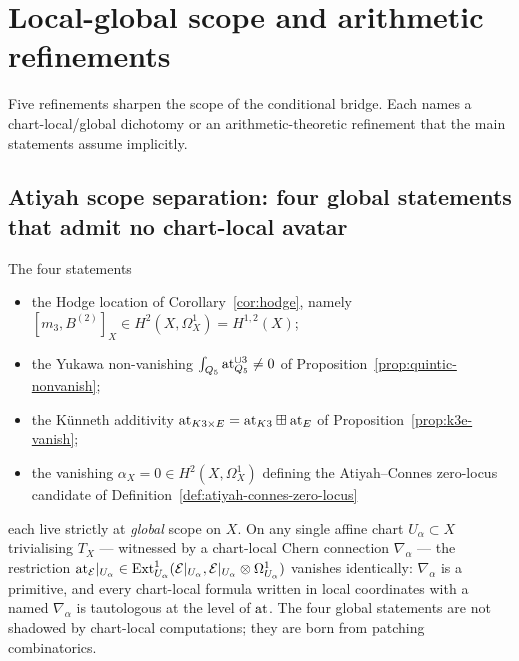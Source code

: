 
\section{Local-global scope and arithmetic refinements}
\label{sec:local-global-arithmetic}

Five refinements sharpen the scope of the conditional bridge. Each names a chart-local/global dichotomy or an arithmetic-theoretic refinement that the main statements assume implicitly.

\subsection{Atiyah scope separation: four global statements that admit no chart-local avatar}
\label{subsec:atiyah-scope-separation}

The four statements
\begin{itemize}
  \item the Hodge location of Corollary~\ref{cor:hodge}, namely $[m_3, B^{(2)}]_X \in H^2(X,\Omega^1_X)=H^{1,2}(X)$;
  \item the Yukawa non-vanishing $\int_{Q_5} \mathrm{at}_{Q_5}^{\cup 3} \neq 0$ of Proposition~\ref{prop:quintic-nonvanish};
  \item the K\"unneth additivity $\mathrm{at}_{K3 \times E} = \mathrm{at}_{K3} \boxplus \mathrm{at}_E$ of Proposition~\ref{prop:k3e-vanish};
  \item the vanishing $\alpha_X=0 \in H^2(X, \Omega^1_X)$ defining the Atiyah--Connes zero-locus candidate of Definition~\ref{def:atiyah-connes-zero-locus}
\end{itemize}
each live strictly at \emph{global} scope on $X$. On any single affine chart $U_\alpha \subset X$ trivialising $T_X$ --- witnessed by a chart-local Chern connection $\nabla_\alpha$ --- the restriction $\mathrm{at}_{\mathcal{E}}|_{U_\alpha} \in \operatorname{Ext}^1_{U_\alpha}(\mathcal{E}|_{U_\alpha}, \mathcal{E}|_{U_\alpha} \otimes \Omega^1_{U_\alpha})$ vanishes identically: $\nabla_\alpha$ is a primitive, and every chart-local formula written in local coordinates with a named $\nabla_\alpha$ is tautologous at the level of $\mathrm{at}$. The four global statements are not shadowed by chart-local computations; they are born from patching combinatorics.

